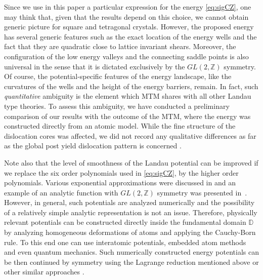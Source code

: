 \documentclass[CRPHYS,Unicode,manuscript]{cedram}
\begin{document}
Since we  use in this paper  a  particular expression for the energy  \eqref{eq:sigCZ},  one may think that, given that  the results  depend on this choice,  we cannot obtain  generic picture   for square and tetragonal crystals. However, the proposed  energy  has several  generic features  such as the exact location of the energy wells and the fact that they are  quadratic   close to   lattice invariant shears.  Moreover,  the configuration of the low energy valleys and the connecting saddle points is also universal in the sense that it is  dictated exclusively by the  $GL(2,\mathbb Z)$ symmetry. Of course, the   potential-specific features of the energy landscape, like  the curvatures of the wells  and the height of the energy barriers, remain.  In fact, such \emph{quantitative} ambiguity is the element which MTM shares with all other Landau type theories. To assess this ambiguity,  we have conducted  a preliminary comparison of our results with the outcome of the MTM,   where the energy was constructed directly from an atomic model. While the fine structure of the dislocation cores was affected, we did not record any qualitative differences as far as the global post yield dislocation pattern  is concerned \cite{R_Baggio}. 

Note also that the level of   smoothness  of the Landau potential  can be  improved if we replace the six order polynomials used in \eqref{eq:sigCZ},  by the higher order polynomials.  Various exponential approximations were discussed in  \cite{Folkins1991-em} and an example of an analytic function with $GL(2,\mathbb Z)$ symmetry  was  presented in~\cite{Baggio2019-rs}.  However, in general, such potentials are analyzed numerically and the possibility of a relatively simple analytic representation  is not an issue.    Therefore, physically  relevant potentials   can be constructed  directly  inside the fundamental domain $\mathbb D$  by analyzing  homogeneous deformations of atoms and applying the Cauchy-Born rule. To this end one can use  interatomic potentials, embedded atom methods and  even quantum mechanics. Such numerically constructed energy potentials can  be then continued by symmetry  using the Lagrange reduction mentioned above or other similar approaches \cite{Engel1986-tm, Grosse-Kunstleve2004-oi,Andrews2019-qp}.




 
 
 
 
 
\end{document}
